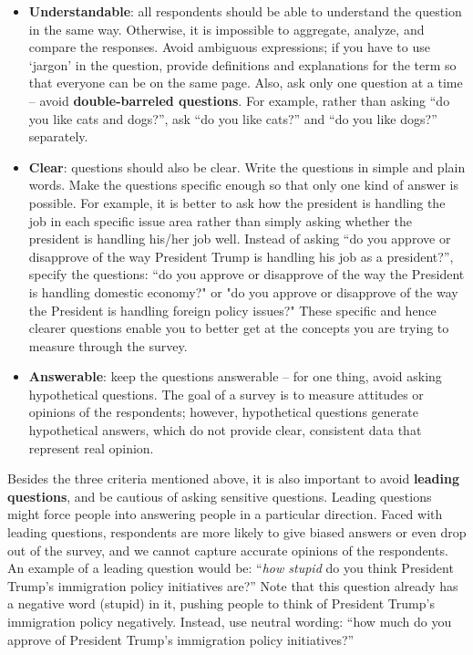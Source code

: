 \documentclass{book}
\begin{document}
\begin{itemize}
\item
  \textbf{Understandable}: all respondents should be able to understand the
  question in the same way. Otherwise, it is impossible to aggregate, analyze,
  and compare the responses. Avoid ambiguous expressions; if you have to use
  `jargon' in the question, provide definitions and explanations for the term
  so that everyone can be on the same page. Also, ask only one question at a
  time -- avoid \textbf{double-barreled questions}. For example, rather than
  asking ``do you like cats and dogs?'', ask ``do you like cats?'' and ``do
  you like dogs?'' separately.
\item
  \textbf{Clear}: questions should also be clear. Write the questions in
  simple and plain words. Make the questions specific enough so that only one
  kind of answer is possible. For example, it is better to ask how the
  president is handling the job in each specific issue area rather than simply
  asking whether the president is handling his/her job well. Instead of asking
  ``do you approve or disapprove of the way President Trump is handling his
  job as a president?'', specify the questions: ``do you approve or disapprove
  of the way the President is handling domestic economy?" or "do you approve
  or disapprove of the way the President is handling foreign policy issues?"
  These specific and hence clearer questions enable you to better get at the
  concepts you are trying to measure through the survey.
\item
  \textbf{Answerable}: keep the questions answerable -- for one thing, avoid
  asking hypothetical questions. The goal of a survey is to measure attitudes
  or opinions of the respondents; however, hypothetical questions generate
  hypothetical answers, which do not provide clear, consistent data that
  represent real opinion.
\end{itemize}

Besides the three criteria mentioned above, it is also important to avoid
\textbf{leading questions}, and be cautious of asking sensitive questions.
Leading questions might force people into answering people in a particular
direction. Faced with leading questions, respondents are more likely to give
biased answers or even drop out of the survey, and we cannot capture accurate
opinions of the respondents. An example of a leading question would be:
``\emph{how stupid} do you think President Trump's immigration policy
initiatives are?'' Note that this question already has a negative word
(stupid) in it, pushing people to think of President Trump's immigration
policy negatively. Instead, use neutral wording: ``how much do you approve of
President Trump's immigration policy initiatives?''
\end{document}
